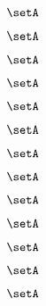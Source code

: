 \begin{forslides}
    \begin{equation}
        \label{eq:slides-processes-129}
        \setA
    \end{equation}

    \begin{equation}
        \label{eq:slides-processes-130}
        \setA
    \end{equation}

    \begin{equation}
        \label{eq:slides-processes-131}
        \setA
    \end{equation}

    \begin{equation}
        \label{eq:slides-processes-132}
        \setA
    \end{equation}

    \begin{equation}
        \label{eq:slides-processes-133}
        \setA
    \end{equation}

    \begin{equation}
        \label{eq:slides-processes-134}
        \setA
    \end{equation}

    \begin{equation}
        \label{eq:slides-processes-135}
        \setA
    \end{equation}

    \begin{equation}
        \label{eq:slides-processes-136}
        \setA
    \end{equation}

    \begin{equation}
        \label{eq:slides-processes-137}
        \setA
    \end{equation}

    \begin{equation}
        \label{eq:slides-processes-138}
        \setA
    \end{equation}

    \begin{equation}
        \label{eq:slides-processes-139}
        \setA
    \end{equation}

    \begin{equation}
        \label{eq:slides-processes-140}
        \setA
    \end{equation}

    \begin{equation}
        \label{eq:slides-processes-141}
        \setA
    \end{equation}


\end{forslides}
